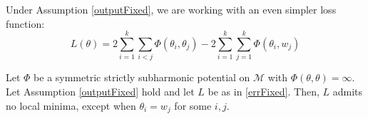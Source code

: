 Under Assumption \ref{outputFixed}, we are working with an even
simpler loss function:
\begin{equation}\label{errFixed}
L(\theta) =  2\sum_{i=1}^k\sum_{i < j} \Phi(\theta_i,\theta_j) - 2\sum_{i=1}^k\sum_{j=1}^k\Phi(\theta_i,w_j)
\end{equation}
%
\begin{theorem}\label{subStrict}
Let $\Phi$ be a symmetric strictly subharmonic potential on $\mathcal{M}$ with $\Phi(\theta,\theta) = \infty$. Let Assumption \ref{outputFixed} hold and let $L$ be as in \eqref{errFixed}. Then, $L$ admits no local minima, except when $\theta_i = w_j$ for some $i, j$.
\end{theorem}
%
